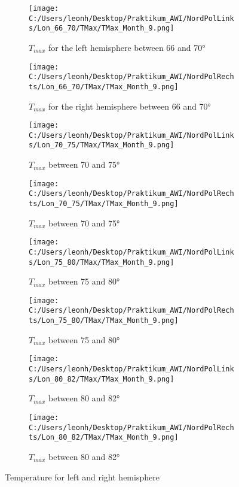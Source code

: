 \begin{figure}[ht]
    \centering
    \begin{subfigure}{0.48\textwidth}
        \centering
        \texttt{[image: C:/Users/leonh/Desktop/Praktikum\_AWI/NordPolLinks/Lon\_66\_70/TMax/TMax\_Month\_9.png]}
        \caption{$T_{max}$ for the left hemisphere between 66 and 70°}
    \end{subfigure}
    \begin{subfigure}{0.48\textwidth}
        \centering
        \texttt{[image: C:/Users/leonh/Desktop/Praktikum\_AWI/NordPolRechts/Lon\_66\_70/TMax/TMax\_Month\_9.png]}
        \caption{$T_{max}$ for the right hemisphere between 66 and 70°}
    \end{subfigure}
    
    \begin{subfigure}{0.48\textwidth}
        \centering
        \texttt{[image: C:/Users/leonh/Desktop/Praktikum\_AWI/NordPolLinks/Lon\_70\_75/TMax/TMax\_Month\_9.png]}
        \caption{$T_{max}$ between 70 and 75°}
    \end{subfigure}
    \begin{subfigure}{0.48\textwidth}
        \centering
        \texttt{[image: C:/Users/leonh/Desktop/Praktikum\_AWI/NordPolRechts/Lon\_70\_75/TMax/TMax\_Month\_9.png]}
        \caption{$T_{max}$ between 70 and 75°}
    \end{subfigure}

        
    \begin{subfigure}{0.48\textwidth}
        \centering
        \texttt{[image: C:/Users/leonh/Desktop/Praktikum\_AWI/NordPolLinks/Lon\_75\_80/TMax/TMax\_Month\_9.png]}
        \caption{$T_{max}$ between 75 and 80°}
    \end{subfigure}
    \begin{subfigure}{0.48\textwidth}
        \centering
        \texttt{[image: C:/Users/leonh/Desktop/Praktikum\_AWI/NordPolRechts/Lon\_75\_80/TMax/TMax\_Month\_9.png]}
        \caption{$T_{max}$ between 75 and 80°}
    \end{subfigure}

    \begin{subfigure}{0.48\textwidth}
        \centering
        \texttt{[image: C:/Users/leonh/Desktop/Praktikum\_AWI/NordPolLinks/Lon\_80\_82/TMax/TMax\_Month\_9.png]}
        \caption{$T_{max}$ between 80 and 82°}
    \end{subfigure}
    \begin{subfigure}{0.48\textwidth}
        \centering
        \texttt{[image: C:/Users/leonh/Desktop/Praktikum\_AWI/NordPolRechts/Lon\_80\_82/TMax/TMax\_Month\_9.png]}
        \caption{$T_{max}$ between 80 and 82°}
    \end{subfigure}
    \caption{Temperature for left and right hemisphere}
    \label{app:MaxTemp}
\end{figure}



